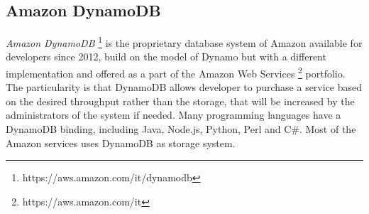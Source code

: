 \subsection{Amazon DynamoDB}
\textit{Amazon DynamoDB} \footnote{https://aws.amazon.com/it/dynamodb} is the proprietary database system of Amazon available for developers since 2012, build on the model of Dynamo but with a different implementation and offered as a part of the Amazon Web Services \footnote{https://aws.amazon.com/it} portfolio. The particularity is that DynamoDB allows developer to purchase a service based on the desired throughput rather than the storage, that will be increased by the administrators of the system if needed.
Many programming languages have a DynamoDB binding, including Java, Node.js, Python, Perl and C\#.
Most of the Amazon services uses DynamoDB as storage system.


